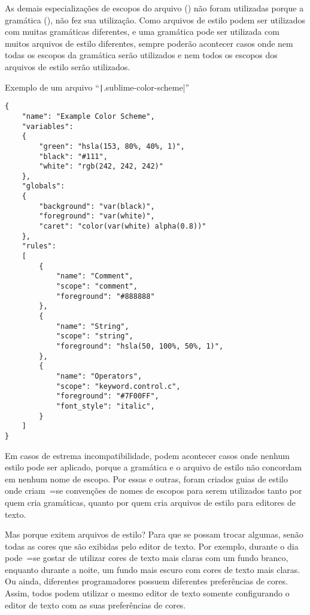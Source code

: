 As demais especializações de escopos do arquivo () não foram utilizadas porque a gramática (),
não fez sua utilização.
Como arquivos de estilo podem ser utilizados com muitas gramáticas diferentes,
e uma gramática pode ser utilizada com muitos arquivos de estilo diferentes,
sempre poderão acontecer casos onde nem todas os escopos da gramática serão utilizados e
nem todos os escopos dos arquivos de estilo serão utilizados.
\begin{code}
\caption[Exemplo de um arquivo ``.sublime-color-scheme'']{Exemplo de um arquivo ``\texttt|.sublime-color-scheme|''}
\label{code:exemploDeUmArquivoSublimeColorScheme}
\begin{verbatim}
{
    "name": "Example Color Scheme",
    "variables":
    {
        "green": "hsla(153, 80%, 40%, 1)",
        "black": "#111",
        "white": "rgb(242, 242, 242)"
    },
    "globals":
    {
        "background": "var(black)",
        "foreground": "var(white)",
        "caret": "color(var(white) alpha(0.8))"
    },
    "rules":
    [
        {
            "name": "Comment",
            "scope": "comment",
            "foreground": "#888888"
        },
        {
            "name": "String",
            "scope": "string",
            "foreground": "hsla(50, 100%, 50%, 1)",
        },
        {
            "name": "Operators",
            "scope": "keyword.control.c",
            "foreground": "#7F00FF",
            "font_style": "italic",
        }
    ]
}
\end{verbatim}
\xpretocmd{\ABNTEXfontereduzida}{\setlength{\parskip}{10pt}\setlength{\belowcaptionskip}{-13pt}}{}{}
\vspace{13pt}
\end{code}

Em casos de estrema incompatibilidade,
podem acontecer casos onde nenhum estilo pode ser aplicado,
porque a gramática e
o arquivo de estilo não concordam em nenhum nome de escopo.
Por essas e
outras,
foram criados guias de estilo \cite{sublimeTextScopeNaming} onde criam~=se convenções de nomes de escopos para serem utilizados tanto por quem cria gramáticas,
quanto por quem cria arquivos de estilo para editores de texto.

Mas porque exitem arquivos de estilo?
Para que se possam trocar algumas,
senão todas as cores que são exibidas pelo editor de texto.
Por exemplo,
durante o dia pode~=se gostar de utilizar cores de texto mais claras com um fundo branco,
enquanto durante a noite,
um fundo mais escuro com cores de texto mais claras.
Ou ainda,
diferentes programadores possuem diferentes preferências de cores.
Assim,
todos podem utilizar o mesmo editor de texto somente configurando o editor de texto com as suas preferências de cores.


